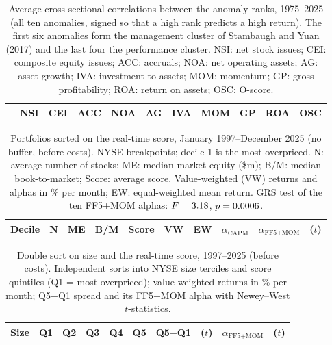 \documentclass[12pt,a4paper]{article}
\begin{document}
\begin{singlespace}
\begin{table}[!htbp]\centering
\caption{Average cross-sectional correlations between the anomaly ranks, 1975--2025 (all ten anomalies, signed so that a high rank predicts a high return). The first six anomalies form the management cluster of Stambaugh and Yuan (2017) and the last four the performance cluster. NSI: net stock issues; CEI: composite equity issues; ACC: accruals; NOA: net operating assets; AG: asset growth; IVA: investment-to-assets; MOM: momentum; GP: gross profitability; ROA: return on assets; OSC: O-score.}\label{tab:corr}
\footnotesize
\setlength{\tabcolsep}{4pt}\begin{tabular}{lrrrrrrrrrr}\toprule
 & NSI & CEI & ACC & NOA & AG & IVA & MOM & GP & ROA & OSC\\\midrule

\bottomrule\end{tabular}
\end{table}

\begin{table}[!htbp]\centering
\caption{Portfolios sorted on the real-time score, January 1997--December 2025 (no buffer, before costs). NYSE breakpoints; decile 1 is the most overpriced. N: average number of stocks; ME: median market equity (\$m); B/M: median book-to-market; Score: average score. Value-weighted (VW) returns and alphas in \% per month; EW: equal-weighted mean return. GRS test of the ten FF5+MOM alphas: $F=3.18$, $p=0.0006$.}\label{tab:deciles}
\footnotesize
\begin{tabular}{lrrrrrrrrr}\toprule
Decile & N & ME & B/M & Score & VW & EW & $\alpha_{\text{CAPM}}$ & $\alpha_{\text{FF5+MOM}}$ & ($t$)\\\midrule

\bottomrule\end{tabular}
\end{table}

\begin{table}[!htbp]\centering
\caption{Double sort on size and the real-time score, 1997--2025 (before costs). Independent sorts into NYSE size terciles and score quintiles (Q1 = most overpriced); value-weighted returns in \% per month; Q5$-$Q1 spread and its FF5+MOM alpha with Newey--West $t$-statistics.}\label{tab:size}
\footnotesize
\begin{tabular}{lrrrrrrrrr}\toprule
Size & Q1 & Q2 & Q3 & Q4 & Q5 & Q5$-$Q1 & ($t$) & $\alpha_{\text{FF5+MOM}}$ & ($t$)\\\midrule

\bottomrule\end{tabular}
\end{table}


\end{singlespace}
\end{document}
